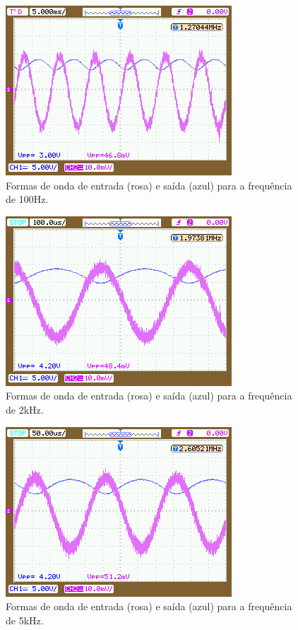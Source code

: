 \documentclass{abntex2}
\begin{document}
  \begin{figure}[h]
    \centering
    \includegraphics[scale = 0.5]{freq_100.png}
    \caption{Formas de onda de entrada (rosa) e saída (azul) para a frequência de 100Hz.}
    \label{fig:freq2}
  \end{figure}

  \begin{figure}[h]
    \centering
    \includegraphics[scale = 0.5]{freq_2k.png}
    \caption{Formas de onda de entrada (rosa) e saída (azul) para a frequência de 2kHz.}
    \label{fig:freq3}
  \end{figure}

  \begin{figure}[h]
    \centering
    \includegraphics[scale = 0.5]{freq_5k.png}
    \caption{Formas de onda de entrada (rosa) e saída (azul) para a frequência de 5kHz.}
    \label{fig:freq4}
  \end{figure}
\end{document}
